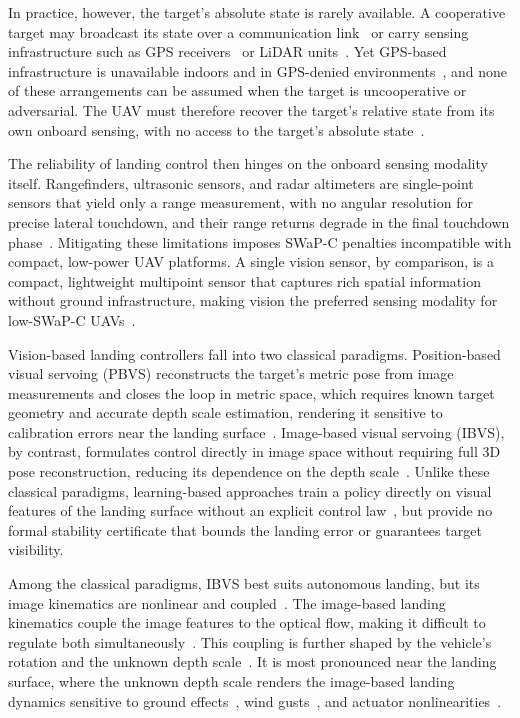 \documentclass{IEEEtaes}
\theoremstyle{definition}
\theoremstyle{remark}
\begin{document}
In practice, however, the target's absolute state is rarely available. A cooperative target may broadcast its state over a communication link~\cite{isilak2025,bouazza2025} or carry sensing infrastructure such as GPS receivers~\cite{cho2022} or LiDAR units~\cite{kim2017}. Yet GPS-based infrastructure is unavailable indoors and in GPS-denied environments~\cite{bautista2023,niu2022}, and none of these arrangements can be assumed when the target is uncooperative or adversarial. The UAV must therefore recover the target's relative state from its own onboard sensing, with no access to the target's absolute state~\cite{wenzel2010,herisse2012}.

The reliability of landing control then hinges on the onboard sensing modality itself. Rangefinders, ultrasonic sensors, and radar altimeters are single-point sensors that yield only a range measurement, with no angular resolution for precise lateral touchdown, and their range returns degrade in the final touchdown phase~\cite{awan2024,veneruso2025}. Mitigating these limitations imposes SWaP-C penalties incompatible with compact, low-power UAV platforms. A single vision sensor, by comparison, is a compact, lightweight multipoint sensor that captures rich spatial information without ground infrastructure, making vision the preferred sensing modality for low-SWaP-C UAVs~\cite{semerikov2025}.

Vision-based landing controllers fall into two classical paradigms. Position-based visual servoing (PBVS) reconstructs the target's metric pose from image measurements and closes the loop in metric space, which requires known target geometry and accurate depth scale estimation, rendering it sensitive to calibration errors near the landing surface~\cite{lin2022}. Image-based visual servoing (IBVS), by contrast, formulates control directly in image space without requiring full 3D pose reconstruction, reducing its dependence on the depth scale~\cite{lin2023}. Unlike these classical paradigms, learning-based approaches train a policy directly on visual features of the landing surface without an explicit control law~\cite{angelis2026}, but provide no formal stability certificate that bounds the landing error or guarantees target visibility.

Among the classical paradigms, IBVS best suits autonomous landing, but its image kinematics are nonlinear and coupled~\cite{chaumette2006}. The image-based landing kinematics couple the image features to the optical flow, making it difficult to regulate both simultaneously~\cite{lee2012}. This coupling is further shaped by the vehicle's rotation and the unknown depth scale~\cite{xie2016_1,jabbari2014}. It is most pronounced near the landing surface, where the unknown depth scale renders the image-based landing dynamics sensitive to ground effects~\cite{sanchez-cuevas2017}, wind gusts~\cite{nekoo2021b}, and actuator nonlinearities~\cite{liu2023}.
\end{document}
